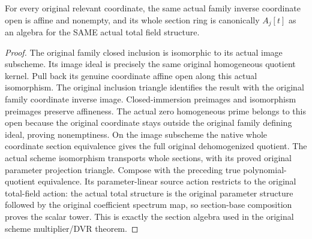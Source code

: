 \begin{lemma}
\label{lem:c0n-original-family-affine-sections}
\leanok
{}
For every original relevant coordinate, the same actual family inverse
coordinate open is affine and nonempty, and its whole section ring is
canonically $A_j[t]$ as an algebra for the SAME actual total field structure.
\end{lemma}
\begin{proof}
The original family closed inclusion is isomorphic to its actual image
subscheme. Its image ideal is precisely the same original homogeneous
quotient kernel. Pull back its genuine coordinate affine open along this
actual isomorphism. The original inclusion triangle identifies the result
with the original family coordinate inverse image. Closed-immersion
preimages and isomorphism preimages preserve affineness. The actual zero
homogeneous prime belongs to this open because the original coordinate
stays outside the original family defining ideal, proving nonemptiness.
On the image subscheme the native whole coordinate section equivalence gives
the full original dehomogenized quotient. The actual scheme isomorphism
transports whole sections, with its proved original parameter projection
triangle. Compose with the preceding true polynomial-quotient equivalence.
Its parameter-linear source action restricts to the original total-field
action: the actual total structure is the original parameter structure
followed by the original coefficient spectrum map, so section-base
composition proves the scalar tower. This is exactly the section algebra
used in the original scheme multiplier/DVR theorem.
\end{proof}

